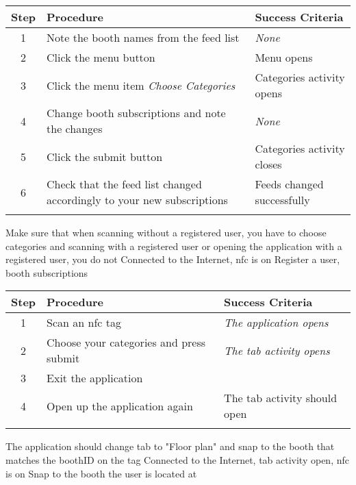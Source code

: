 \begin{center}
\begin{tabular}{| c | p{4.6cm} | p{4.6cm} |}
\hline
\textbf{Step} & \textbf{Procedure} & \textbf{Success Criteria}\\
\hline
1 & Note the booth names from the feed list & \textit{None}\\
\hline
2 & Click the menu button & Menu opens\\
\hline
3 & Click the menu item \textit{Choose Categories} & Categories activity opens\\
\hline
4 & Change booth subscriptions and note the changes & \textit{None}\\
\hline
5 & Click the submit button & Categories activity closes\\
\hline
6 & Check that the feed list changed accordingly to your new subscriptions & Feeds changed successfully\\
\hline
\multicolumn{3}{c}{} \\%
\end{tabular}
\end{center}

\testcase
{\casesix}
{Make sure that when scanning without a registered user, you have to choose categories and scanning with a registered user or opening the application with a registered user, you do not}
{Connected to the Internet, \ac{nfc} is on}
{Register a user, booth subscriptions}

\begin{center}
\begin{tabular}{| c | p{4.6cm} | p{4.6cm} |}
\hline
\textbf{Step} & \textbf{Procedure} & \textbf{Success Criteria}\\
\hline
1 & Scan an \ac{nfc} tag & \textit{The application opens}\\
\hline
2 & Choose your categories and press submit & \textit{The tab activity opens}\\
\hline
3 & Exit the application & \\
\hline
4 & Open up the application again & The tab activity should open\\
\hline
\multicolumn{3}{c}{} \\%
\end{tabular}
\end{center}

\testcase
{\caseseven}
{The application should change tab to "Floor plan" and snap to the booth that matches the boothID on the tag}
{Connected to the Internet,  tab activity open, \ac{nfc} is on}
{Snap to the booth the user is located at}

